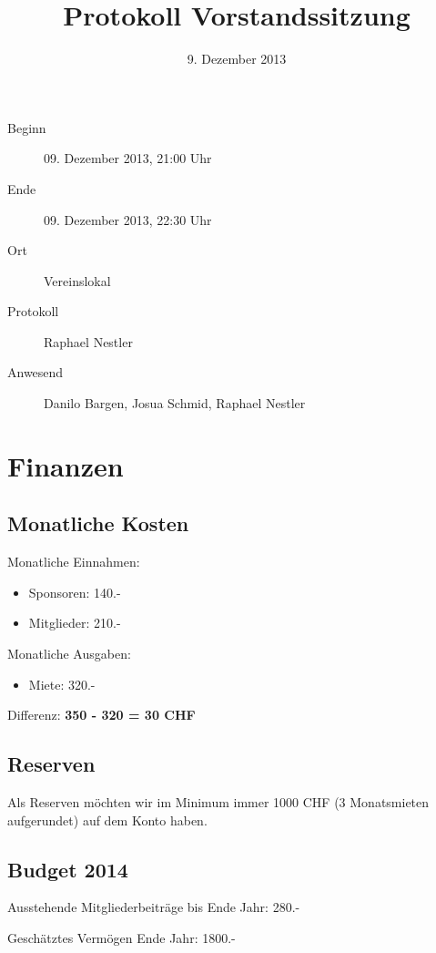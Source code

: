 \documentclass[10pt,a4paper,parskip,fleqn]{scrartcl}
\title{Protokoll Vorstandssitzung}
\date{9. Dezember 2013}
\newcommand{\ul}{\begin{itemize}[itemsep=-0.3em,topsep=-0.3em]}
\newcommand{\lu}{\end{itemize}}
\newcommand{\li}{\item}
\begin{document}
\begin{titlepage}

	\maketitle
	\thispagestyle{empty} %

	\vfill

	\begin{description}
		\item[Beginn] 09. Dezember 2013, 21:00 Uhr
		\item[Ende] 09. Dezember 2013, 22:30 Uhr
		\item[Ort] Vereinslokal
		\item[Protokoll] Raphael Nestler
		\item[Anwesend] Danilo Bargen, Josua Schmid, Raphael Nestler
	\end{description}

\end{titlepage}


\section{Finanzen}

\subsection{Monatliche Kosten}

Monatliche Einnahmen:

\ul
	\li Sponsoren: 140.-
	\li Mitglieder: 210.-
\lu

Monatliche Ausgaben:

\ul
	\li Miete: 320.-
\lu

Differenz: \textbf{350 - 320 = 30 CHF}

\subsection{Reserven}

Als Reserven möchten wir im Minimum immer 1000 CHF (3 Monatsmieten aufgerundet)
auf dem Konto haben.

\subsection{Budget 2014}

Ausstehende Mitgliederbeiträge bis Ende Jahr: 280.-

Geschätztes Vermögen Ende Jahr: 1800.-
\end{document}
